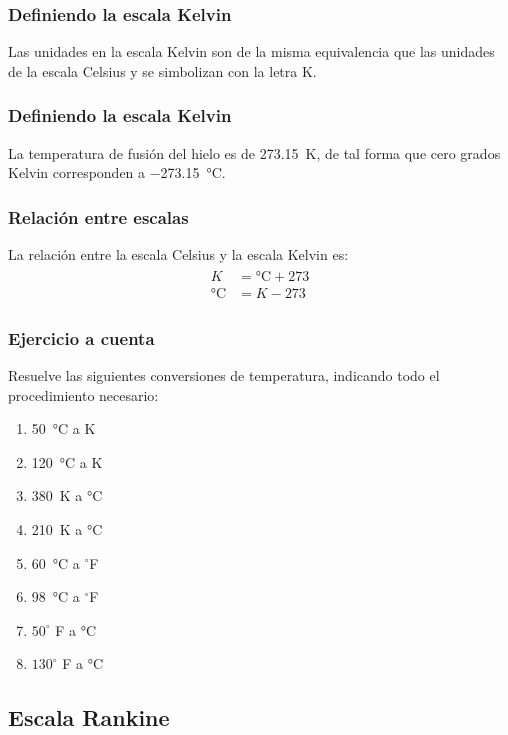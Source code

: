 \documentclass[14pt]{beamer}
\begin{document}
\begin{frame}
\frametitle{Definiendo la escala Kelvin}
Las unidades en la escala Kelvin son de la misma equivalencia que las unidades de la escala Celsius y se simbolizan con la letra K.
\end{frame}
\begin{frame}
\frametitle{Definiendo la escala Kelvin}    
La temperatura de fusión del hielo es de \SI{273.15}{\kelvin}, de tal forma que cero grados Kelvin corresponden a \SI{-273.15}{\degreeCelsius}. 
\end{frame}
\begin{frame}
\frametitle{Relación entre escalas}
La relación entre la escala Celsius y la escala Kelvin es:
\pause
\begin{eqnarray*}
\begin{aligned}
K &= \unit{\degreeCelsius} + 273 \\
\unit{\degreeCelsius} &= K - 273
\end{aligned}
\end{eqnarray*}
\end{frame}
\begin{frame}
\frametitle{Ejercicio a cuenta}
Resuelve las siguientes conversiones de temperatura, indicando todo el procedimiento necesario:
\pause
\begin{multicols}{2}
\begin{enumerate}
\item \SI{50}{\degreeCelsius} a \unit{\kelvin}
\item \SI{120}{\degreeCelsius} a \unit{\kelvin}
\item \SI{380}{\kelvin} a \unit{\degreeCelsius}
\item \SI{210}{\kelvin} a \unit{\degreeCelsius}
\item \SI{60}{\degreeCelsius} a $^{\circ}$F
\item \SI{98}{\degreeCelsius} a $^{\circ}$F
\item $50^{\circ}$ F a \unit{\degreeCelsius}
\item $130^{\circ}$ F a \unit{\degreeCelsius}    
\end{enumerate}
\end{multicols}
\end{frame}

\subsection{Escala Rankine}
\end{document}
